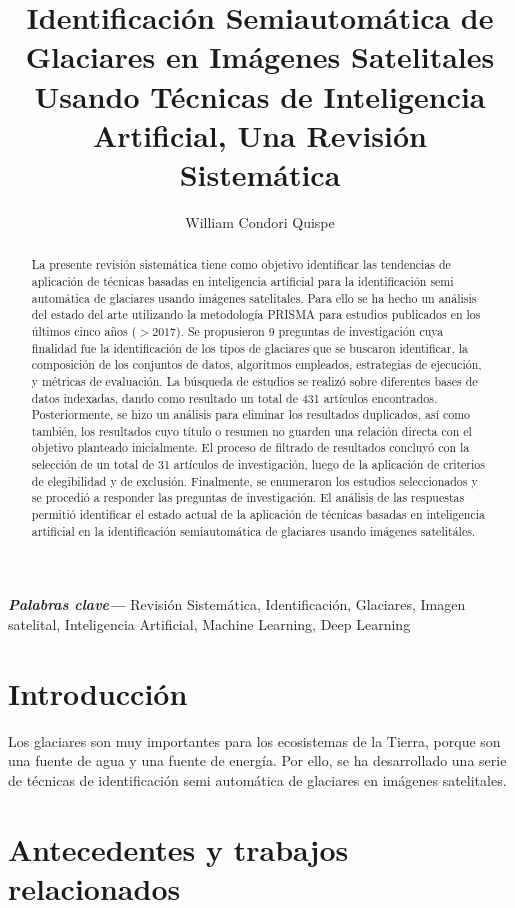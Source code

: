 \documentclass{article}
\title{Identificación Semiautomática de Glaciares en Imágenes Satelitales Usando Técnicas de Inteligencia Artificial, Una Revisión Sistemática}
\author{William Condori Quispe}
\providecommand{\keywords}[1]{\textbf{\textit{Palabras clave---}} #1}
\begin{document}
\maketitle

\begin{abstract}

    La presente revisión sistemática tiene como objetivo identificar las tendencias de aplicación de técnicas basadas en inteligencia artificial para la identificación semi automática de glaciares usando imágenes satelitales. Para ello se ha hecho un análisis del estado del arte utilizando la metodología PRISMA para estudios publicados en los últimos cinco años ($>2017$). Se propusieron 9 preguntas de investigación cuya finalidad fue la identificación de los tipos de glaciares que se buscaron identificar, la composición de los conjuntos de datos, algoritmos empleados, estrategias de ejecución, y métricas de evaluación. La búsqueda de estudios se realizó sobre diferentes bases de datos indexadas, dando como resultado un total de 431 artículos encontrados. Posteriormente, se hizo un análisis para eliminar los resultados duplicados, así como también, los resultados cuyo título o resumen no guarden una relación directa con el objetivo planteado inicialmente. El proceso de filtrado de resultados concluyó con la selección de un total de 31 artículos de investigación, luego de la aplicación de criterios de elegibilidad y de exclusión. Finalmente, se enumeraron los estudios seleccionados y se procedió a responder las preguntas de investigación. El análisis de las respuestas permitió identificar el estado actual de la aplicación de técnicas basadas en inteligencia artificial en la identificación semiautomática de glaciares usando imágenes satelitáles.
\end{abstract}

\keywords{
    Revisión Sistemática,
    Identificación,
    Glaciares,
    Imagen satelital,
    Inteligencia Artificial,
    Machine Learning,
    Deep Learning
}


\section{Introducción}

Los glaciares son muy importantes para los ecosistemas de la Tierra, porque son una fuente de agua y una fuente de energía. Por ello, se ha desarrollado una serie de técnicas de identificación semi automática de glaciares en imágenes satelitales.

\section{Antecedentes y trabajos relacionados}
\end{document}
